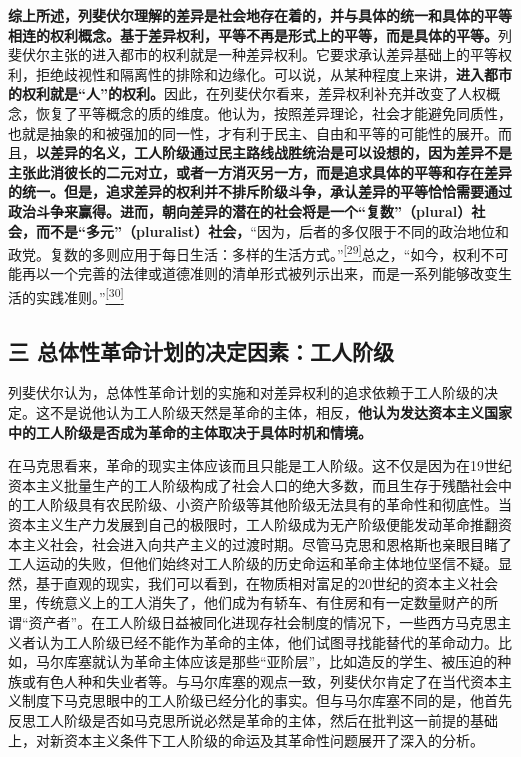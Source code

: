 \documentclass[UTF8, fontset = sourcesans, a4paper, oneside, zihao =
-4, scheme=chinese, no-math, space=true]{ctexbook}
\begin{document}
\textbf{综上所述，列斐伏尔理解的差异是社会地存在着的，并与具体的统一和具体的平等相连的权利概念。基于差异权利，平等不再是形式上的平等，而是具体的平等。}列斐伏尔主张的进入都市的权利就是一种差异权利。它要求承认差异基础上的平等权利，拒绝歧视性和隔离性的排除和边缘化。可以说，从某种程度上来讲，\textbf{进入都市的权利就是``人''的权利。}因此，在列斐伏尔看来，差异权利补充并改变了人权概念，恢复了平等概念的质的维度。他认为，按照差异理论，社会才能避免同质性，也就是抽象的和被强加的同一性，才有利于民主、自由和平等的可能性的展开。而且，\textbf{以差异的名义，工人阶级通过民主路线战胜统治是可以设想的，因为差异不是主张此消彼长的二元对立，或者一方消灭另一方，而是追求具体的平等和存在差异的统一。但是，追求差异的权利并不排斥阶级斗争，承认差异的平等恰恰需要通过政治斗争来赢得。进而，朝向差异的潜在的社会将是一个``复数''（plural）社会，而不是``多元''（pluralist）社会，}``因为，后者的多仅限于不同的政治地位和政党。复数的多则应用于每日生活：多样的生活方式。''\protect\hypertarget{part0008_split_002.htmlux5cux23w29}{}{}\protect\hyperlink{part0008_split_003.htmlux5cux23m29}{\textsuperscript{{[}29{]}}}总之，``如今，权利不可能再以一个完善的法律或道德准则的清单形式被列示出来，而是一系列能够改变生活的实践准则。''\protect\hypertarget{part0008_split_002.htmlux5cux23w30}{}{}\protect\hyperlink{part0008_split_003.htmlux5cux23m30}{\textsuperscript{{[}30{]}}}

\subsection{三
总体性革命计划的决定因素：工人阶级}\label{part0008_split_002.htmlux5cux23c041}

列斐伏尔认为，总体性革命计划的实施和对差异权利的追求依赖于工人阶级的决定。这不是说他认为工人阶级天然是革命的主体，相反，\textbf{他认为发达资本主义国家中的工人阶级是否成为革命的主体取决于具体时机和情境。}

在马克思看来，革命的现实主体应该而且只能是工人阶级。这不仅是因为在19世纪资本主义批量生产的工人阶级构成了社会人口的绝大多数，而且生存于残酷社会中的工人阶级具有农民阶级、小资产阶级等其他阶级无法具有的革命性和彻底性。当资本主义生产力发展到自己的极限时，工人阶级成为无产阶级便能发动革命推翻资本主义社会，社会进入向共产主义的过渡时期。尽管马克思和恩格斯也亲眼目睹了工人运动的失败，但他们始终对工人阶级的历史命运和革命主体地位坚信不疑。显然，基于直观的现实，我们可以看到，在物质相对富足的20世纪的资本主义社会里，传统意义上的工人消失了，他们成为有轿车、有住房和有一定数量财产的所谓``资产者''。在工人阶级日益被同化进现存社会制度的情况下，一些西方马克思主义者认为工人阶级已经不能作为革命的主体，他们试图寻找能替代的革命动力。比如，马尔库塞就认为革命主体应该是那些``亚阶层''，比如造反的学生、被压迫的种族或有色人种和失业者等。与马尔库塞的观点一致，列斐伏尔肯定了在当代资本主义制度下马克思眼中的工人阶级已经分化的事实。但与马尔库塞不同的是，他首先反思工人阶级是否如马克思所说必然是革命的主体，然后在批判这一前提的基础上，对新资本主义条件下工人阶级的命运及其革命性问题展开了深入的分析。
\end{document}
